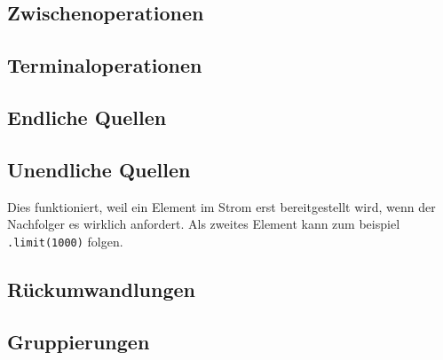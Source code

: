 	\subsection*{Zwischenoperationen}
		
	\subsection*{Terminaloperationen} 
		
	\begin{minipage}[t]{10cm}
		\subsection*{Endliche Quellen}
		
	\end{minipage}
	\hspace*{0.5cm}
	\begin{minipage}[t]{8.3cm}
		\subsection*{Unendliche Quellen}
		
		Dies funktioniert, weil ein Element im Strom erst bereitgestellt wird, wenn der Nachfolger es wirklich anfordert. Als zweites Element kann zum beispiel \texttt{.limit(1000)} folgen.
	\end{minipage}
	\subsection*{Rückumwandlungen}
	\begin{minipage}[t]{8.9cm}
		
	\end{minipage}
	\hspace*{0.5cm}
	\begin{minipage}[t]{8.9cm}
		
	\end{minipage}
	\subsection*{Gruppierungen}
	
		
